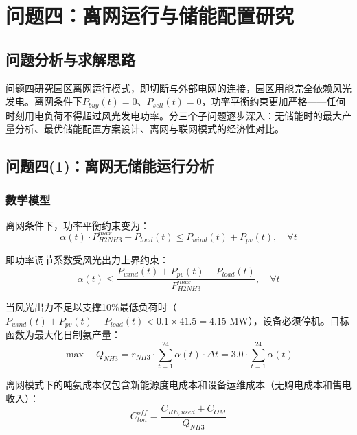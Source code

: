 \section{问题四：离网运行与储能配置研究}

\subsection{问题分析与求解思路}

问题四研究园区离网运行模式，即切断与外部电网的连接，园区用能完全依赖风光发电。离网条件下$P_{buy}(t) = 0$、$P_{sell}(t) = 0$，功率平衡约束更加严格——任何时刻用电负荷不得超过风光发电功率。分三个子问题逐步深入：无储能时的最大产量分析、最优储能配置方案设计\cite{ref6}、离网与联网模式的经济性对比。


\subsection{问题四(1)：离网无储能运行分析}

\subsubsection{数学模型}

离网条件下，功率平衡约束变为：
\begin{equation}
\alpha(t) \cdot P_{H2NH3}^{max} + P_{load}(t) \leq P_{wind}(t) + P_{pv}(t), \quad \forall t
\end{equation}

即功率调节系数受风光出力上界约束：
\begin{equation}
\alpha(t) \leq \frac{P_{wind}(t) + P_{pv}(t) - P_{load}(t)}{P_{H2NH3}^{max}}, \quad \forall t
\end{equation}

当风光出力不足以支撑10\%最低负荷时（$P_{wind}(t) + P_{pv}(t) - P_{load}(t) < 0.1 \times 41.5 = 4.15$ MW），设备必须停机。目标函数为最大化日制氨产量：
\begin{equation}
\max \quad Q_{NH3} = r_{NH3} \cdot \sum_{t=1}^{24} \alpha(t) \cdot \Delta t = 3.0 \cdot \sum_{t=1}^{24} \alpha(t)
\end{equation}

离网模式下的吨氨成本仅包含新能源度电成本和设备运维成本（无购电成本和售电收入）：
\begin{equation}
C_{ton}^{off} = \frac{C_{RE,used} + C_{OM}}{Q_{NH3}}
\end{equation}

